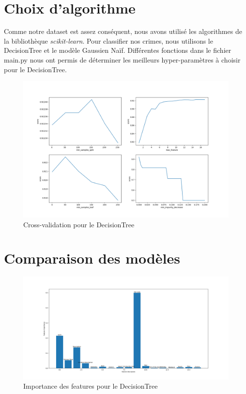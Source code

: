 \documentclass{article}
\begin{document}
    \section{Choix d'algorithme}
    Comme notre dataset est assez conséquent, nous avons utilisé les algorithmes 
    de la bibliothèque \textit{scikit-learn}.
    Pour classifier nos crimes, nous utilisons le DecisionTree et le modèle Gaussien Naïf.
    Différentes fonctions dans le fichier main.py nous ont permis de déterminer
    les meilleurs hyper-paramètres à choisir pour le DecisionTree.
    \begin{figure}[H]
            \centering
	    \includegraphics[scale=.4]{bestParamDecisionTree.png}
	    \caption{Cross-validation pour le DecisionTree}
    \end{figure}

    \section{Comparaison des modèles}
    \begin{figure}[H]
            \centering
	    \includegraphics[scale=.35]{Images/feature_importance.png}
	    \caption{Importance des features pour le DecisionTree}
    \end{figure}
\end{document}
